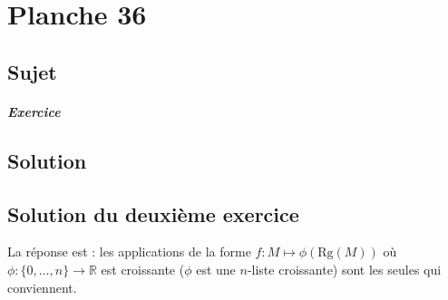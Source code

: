 \chapter{Planche 36}

\section{Sujet}

\paragraph{Exercice}

\section{Solution}

\section{Solution du deuxième exercice}

La réponse est : les applications de la forme $f: \displaystyle M\mapsto \phi(\mbox{Rg}(M))$ où $\displaystyle \phi : \{0,\ldots,n\}\rightarrow \mathbb{R}$ est croissante ($\phi$ est une $n$-liste croissante) sont les seules qui conviennent.


